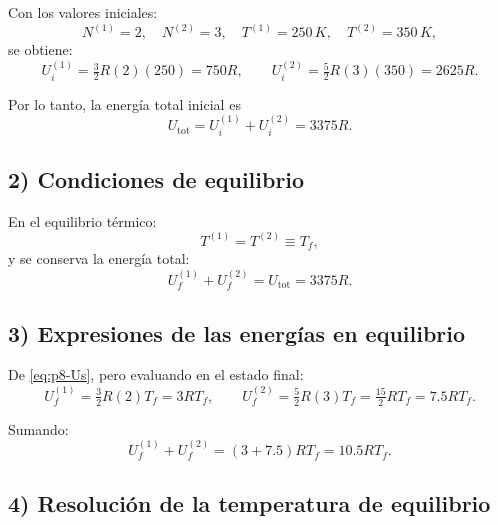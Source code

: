 \documentclass{article}
\begin{document}
Con los valores iniciales:
\[
N^{(1)}=2, 
\quad N^{(2)}=3, 
\quad T^{(1)}=250\,K, 
\quad T^{(2)}=350\,K,
\]
se obtiene:
\begin{equation}
U^{(1)}_i = \tfrac{3}{2}R(2)(250) = 750R,
\qquad
U^{(2)}_i = \tfrac{5}{2}R(3)(350) = 2625R.
\label{eq:p8-Uinic}
\end{equation}

Por lo tanto, la energía total inicial es
\begin{equation}
U_{\text{tot}} = U^{(1)}_i + U^{(2)}_i = 3375R.
\label{eq:p8-Utot}
\end{equation}

\subsection*{2) Condiciones de equilibrio}

En el equilibrio térmico:
\begin{equation}
T^{(1)} = T^{(2)} \equiv T_f,
\label{eq:p8-Tf}
\end{equation}
y se conserva la energía total:
\begin{equation}
U^{(1)}_f + U^{(2)}_f = U_{\text{tot}} = 3375R.
\label{eq:p8-cons}
\end{equation}

\subsection*{3) Expresiones de las energías en equilibrio}

De \eqref{eq:p8-Us}, pero evaluando en el estado final:
\begin{equation}
U^{(1)}_f = \tfrac{3}{2}R(2)T_f = 3RT_f,
\qquad
U^{(2)}_f = \tfrac{5}{2}R(3)T_f = \tfrac{15}{2}RT_f = 7.5RT_f.
\label{eq:p8-Ufin}
\end{equation}

Sumando:
\begin{equation}
U^{(1)}_f + U^{(2)}_f = (3 + 7.5)RT_f = 10.5RT_f.
\label{eq:p8-Ufin-sum}
\end{equation}

\subsection*{4) Resolución de la temperatura de equilibrio}
\end{document}
